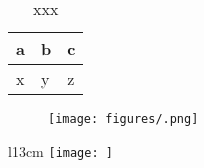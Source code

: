 \begin{table}[H]
    \caption[\textbf{}]{\scriptsize{xxx}}
    \begin{tabular}{lll} 
     \textbf{a} & \textbf{b} & \textbf{c} \\
     \hline \hline
     x & y & z \\
     \hline
    \end{tabular}
    \label{tab:tab_label}
\end{table}

\begin{figure}[H]
    \centering
    \texttt{[image: figures/.png]}
    \caption[\textbf{}]{\textbf{}}
    \label{fig:fig_label}
\end{figure}

\begin{sidewaysfigure}
\centering

\caption[\textbf{}]{\textbf{}}
\label{fig:}
\end{sidewaysfigure}

\begin{wrapfigure}{l}{13cm}
\texttt{[image: ]}
\caption{\textbf{} }
\label{fig:}
\end{wrapfigure}
